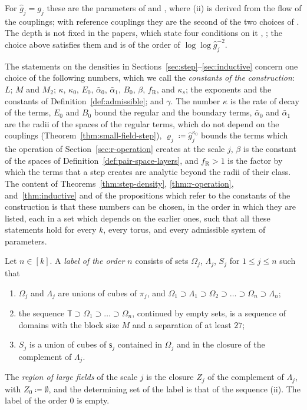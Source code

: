 \documentclass[11pt]{preprint}
\numberwithin{equation}{section}
\begin{document}
For $\hat g_j = g_j$ these are the parameters of \cite[(2.4)--(2.9), (2.28)]{BalabanCRE} and \cite[p.~183]{BalabanLFR1}, where (ii) is derived from the flow of the couplings; with reference couplings they are the second of the two choices of \cite[p.~246]{BalabanCRE}. The depth is not fixed in the papers, which state four conditions on it \cite[pp.~179, 198]{BalabanLFR1}, \cite[pp.~361, 363]{BalabanLFR2}; the choice above satisfies them and is of the order of $\log\log\hat g_j^{-2}$.

The statements on the densities in Sections~\ref{sec:step}--\ref{sec:inductive} concern one choice of the following numbers, which we call the \emph{constants of the construction}: $L$; $M$ and $M_2$; $\kappa$, $\kappa_0$, $E_0$, $\bar\alpha_0$, $\bar\alpha_1$, $B_0$, $\beta$, $f_{\mathrm R}$, and $\kappa_s$; the exponents and the constants of Definition~\ref{def:admissible}; and $\gamma$. The number $\kappa$ is the rate of decay of the terms, $E_0$ and $B_0$ bound the regular and the boundary terms, $\bar\alpha_0$ and $\bar\alpha_1$ are the radii of the spaces of the regular terms, which do not depend on the couplings (Theorem~\ref{thm:small-field-step}), $\varrho_j \coloneqq \hat g_j^{\kappa_0}$ bounds the terms which the operation of Section~\ref{sec:r-operation} creates at the scale $j$, $\beta$ is the constant of the spaces of Definition~\ref{def:pair-space-layers}, and $f_{\mathrm R} > 1$ is the factor by which the terms that a step creates are analytic beyond the radii of their class. The content of Theorems~\ref{thm:step-density}, \ref{thm:r-operation}, and~\ref{thm:inductive} and of the propositions which refer to the constants of the construction is that these numbers can be chosen, in the order in which they are listed, each in a set which depends on the earlier ones, such that all these statements hold for every $k$, every torus, and every admissible system of parameters.

\begin{definition}[Labels]\label{def:label}
Let $n \in [k]$. A \emph{label of the order $n$} consists of sets $\Omega_j$, $\Lambda_j$, $S_j$ for $1 \leqslant j \leqslant n$ such that
\begin{enumerate}[label=(\roman*)]
\item $\Omega_j$ and $\Lambda_j$ are unions of cubes of $\pi_j$, and $\Omega_1 \supset \Lambda_1 \supset \Omega_2 \supset \dots \supset \Omega_n \supset \Lambda_n$;
\item the sequence $\mathbb T \supset \Omega_1 \supset \dots \supset \Omega_n$, continued by empty sets, is a sequence of domains with the block size $M$ and a separation of at least $27$;
\item $S_j$ is a union of cubes of $\mathsf s_j$ contained in $\Omega_j$ and in the closure of the complement of $\Lambda_j$.
\end{enumerate}
The \emph{region of large fields} of the scale $j$ is the closure $Z_j$ of the complement of $\Lambda_j$, with $Z_0 \coloneqq \emptyset$, and the determining set of the label is that of the sequence (ii). The label of the order $0$ is empty.
\end{definition}
\end{document}
